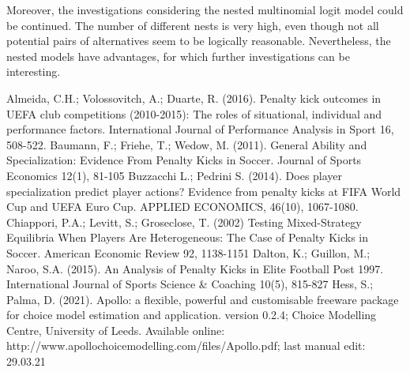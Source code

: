 \documentclass[12pt,dvipsnames]{article}%
\begin{document}
Moreover, the investigations considering the nested multinomial logit model could be continued. The number of different nests is very high, even though not all potential pairs of alternatives seem to be logically reasonable. Nevertheless, the nested models have advantages, for which further investigations can be interesting. 


\newpage
\newpage
\clearpage
{}
\setcounter{page}{5}

\begin{thebibliography}{99}

 Almeida, C.H.; Volossovitch, A.; Duarte, R. (2016). Penalty kick outcomes in UEFA club competitions (2010-2015): The roles of situational, individual and performance factors. International Journal of Performance Analysis in Sport 16, 508-522.
 Baumann, F.; Friehe, T.; Wedow, M. (2011). General Ability and Specialization: Evidence From Penalty Kicks in Soccer. Journal of Sports Economics 12(1), 81-105
 Buzzacchi L.; Pedrini S. (2014). Does player specialization predict player actions? Evidence from penalty kicks at FIFA World Cup and UEFA Euro Cup. APPLIED ECONOMICS, 46(10), 1067-1080.
 Chiappori, P.A.; Levitt, S.; Groseclose, T. (2002) Testing Mixed-Strategy Equilibria When Players Are Heterogeneous: The Case of Penalty Kicks in Soccer. American Economic Review 92, 1138-1151
 Dalton, K.; Guillon, M.; Naroo, S.A. (2015). An Analysis of Penalty Kicks in Elite Football Post 1997. International Journal of Sports Science \& Coaching 10(5), 815-827
 Hess, S.; Palma, D. (2021). Apollo: a flexible, powerful and customisable freeware package for choice model estimation and application. version 0.2.4; Choice Modelling Centre, University of Leeds. Available online: http://www.apollochoicemodelling.com/files/Apollo.pdf; last manual edit: 29.03.21

\end{thebibliography}
\end{document}
